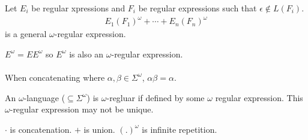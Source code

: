 \documentclass[../598comp.tex]{subfiles}
\begin{document}
Let $E_i$ be regular xpressions and $F_i$ be regular expressions such that
$\epsilon \notin L(F_i)$.
\begin{gather*}
  E_1(F_1)^\omega + \cdots + E_n(F_n)^\omega
\end{gather*}
is a general $\omega$-regular expression.

$E^\omega = E E^\omega$ so $E^\omega$ is also an $\omega$-regular expression.
\\\\
When concatenating where $\alpha, \beta \in \Sigma^\omega$, $\alpha \beta = \alpha$.

\begin{definition}
  An $\omega$-language ($\subseteq \Sigma^\omega$) is $\omega$-regluar if defined
  by some $\omega$ regular expression. This $\omega$-regular expression may not
  be unique.
  \begin{note}
    $\cdot$ is concatenation. $+$ is union. $(.)^\omega$ is infinite repetition.
  \end{note}
\end{definition}
\end{document}
